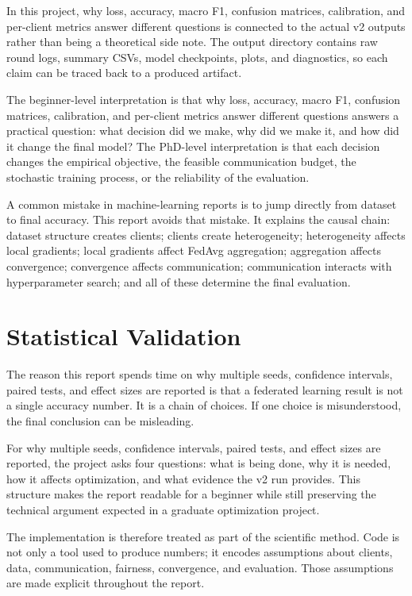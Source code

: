 \documentclass[11pt]{report}
\begin{document}
In this project, why loss, accuracy, macro F1, confusion matrices, calibration, and per-client
metrics answer different questions is connected to the actual v2 outputs rather than being a
theoretical side note. The output directory contains raw round logs, summary CSVs, model
checkpoints, plots, and diagnostics, so each claim can be traced back to a produced artifact.

The beginner-level interpretation is that why loss, accuracy, macro F1, confusion matrices,
calibration, and per-client metrics answer different questions answers a practical question: what
decision did we make, why did we make it, and how did it change the final model? The PhD-level
interpretation is that each decision changes the empirical objective, the feasible communication
budget, the stochastic training process, or the reliability of the evaluation.

A common mistake in machine-learning reports is to jump directly from dataset to final accuracy.
This report avoids that mistake. It explains the causal chain: dataset structure creates clients;
clients create heterogeneity; heterogeneity affects local gradients; local gradients affect FedAvg
aggregation; aggregation affects convergence; convergence affects communication; communication
interacts with hyperparameter search; and all of these determine the final evaluation.

\chapter{Statistical Validation}
The reason this report spends time on why multiple seeds, confidence intervals, paired tests, and
effect sizes are reported is that a federated learning result is not a single accuracy number. It is
a chain of choices. If one choice is misunderstood, the final conclusion can be misleading.

For why multiple seeds, confidence intervals, paired tests, and effect sizes are reported, the
project asks four questions: what is being done, why it is needed, how it affects optimization, and
what evidence the v2 run provides. This structure makes the report readable for a beginner while
still preserving the technical argument expected in a graduate optimization project.

The implementation is therefore treated as part of the scientific method. Code is not only a tool
used to produce numbers; it encodes assumptions about clients, data, communication, fairness,
convergence, and evaluation. Those assumptions are made explicit throughout the report.
\end{document}
